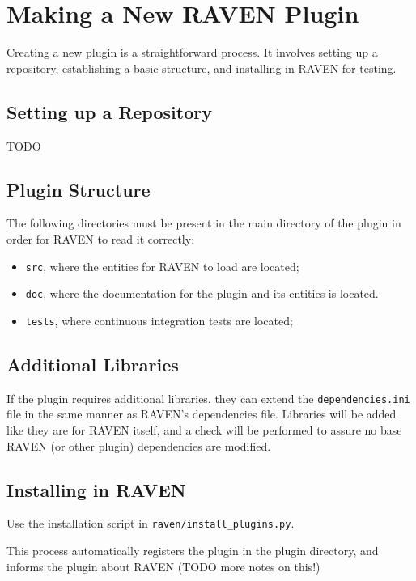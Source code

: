 \section{Making a New RAVEN Plugin}

Creating a new plugin is a straightforward process. It involves setting up a repository,
establishing a basic structure, and installing in RAVEN for testing.

\subsection{Setting up a Repository}
TODO

\subsection{Plugin Structure}
The following directories must be present in the main directory of the plugin in order for RAVEN to
read it correctly:
\begin{itemize}
  \item \texttt{src}, where the entities for RAVEN to load are located;
  \item \texttt{doc}, where the documentation for the plugin and its entities is located.
  \item \texttt{tests}, where continuous integration tests are located;
\end{itemize}

\subsection{Additional Libraries}
If the plugin requires additional libraries, they can extend the \texttt{dependencies.ini} file in
the same manner as RAVEN's dependencies file. Libraries will be added like they are for RAVEN
itself, and a check will be performed to assure no base RAVEN (or other plugin) dependencies are
modified.

\subsection{Installing in RAVEN}
Use the installation script in \texttt{raven/install\_plugins.py}.

This process automatically registers the plugin in the plugin directory, and informs the plugin
about RAVEN (TODO more notes on this!)